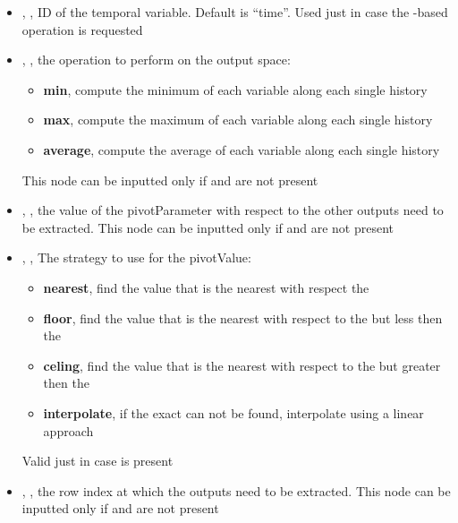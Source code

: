 \begin{itemize}
   \item {}, , ID of the temporal variable. Default is ``time''.
   \nb Used just in case the  -based operation  is requested
    \item {}, , the operation to perform on the output space:
      \begin{itemize}
        \item \textbf{min}, compute the minimum of each variable along each single history
         \item \textbf{max}, compute the maximum of each variable along each single history
         \item \textbf{average}, compute the average of each variable along each single history
       \end{itemize}
        \nb This node can be inputted only if  and  are not present
     \item {}, , the value of the pivotParameter with respect to the other outputs need to be extracted.
       \nb This node can be inputted only if  and  are not present
     \item {}, , The strategy to use for the pivotValue:
       \begin{itemize}
        \item \textbf{nearest}, find the value that is the nearest with respect the 
        \item \textbf{floor}, find the value that is the nearest with respect to the  but less then the  
        \item \textbf{celing}, find the value that is the nearest with respect to the  but greater then the  
        \item \textbf{interpolate}, if the exact    can not be found, interpolate using a linear approach
       \end{itemize}

       \nb Valid just in case  is present
     \item {}, , the row index at which the outputs need to be extracted.
       \nb This node can be inputted only if  and  are not present
\end{itemize}

